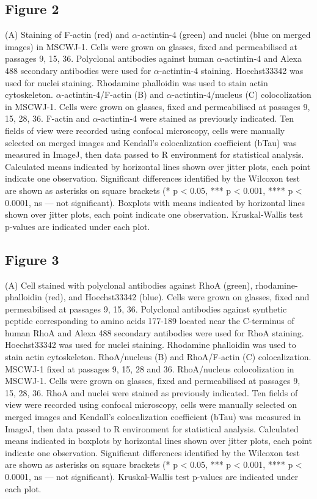 \documentclass[alpha-refs]{wiley-article}
\begin{document}
\subsection*{Figure 2}
(A) Staining of F-actin (red) and $\alpha$-actintin-4 (green) and nuclei (blue on merged images) in MSCWJ-1.
Cells were grown on glasses, fixed and permeabilised at passages 9, 15, 36.
Polyclonal antibodies against human $\alpha$-actintin-4 and Alexa 488 secondary antibodies were used for $\alpha$-actintin-4 staining.
Hoechst33342 was used for nuclei staining.
Rhodamine phalloidin was used to stain actin cytoskeleton.
$\alpha$-actintin-4/F-actin (B) and $\alpha$-actintin-4/nucleus (C) colocolization in MSCWJ-1.
Cells were grown on glasses, fixed and permeabilised at passages 9, 15, 28, 36.
F-actin and $\alpha$-actintin-4 were stained as previously indicated.
Ten fields of view were recorded using confocal microscopy, cells were manually selected on merged images and Kendall's colocalization coefficient (bTau) was measured in ImageJ, then data passed to R environment for statistical analysis.
Calculated means indicated by horizontal lines shown over jitter plots, each point indicate one observation.
Significant differences identified by the Wilcoxon test are shown as asterisks on square brackets (* p < 0.05, *** p < 0.001, **** p < 0.0001, ns --- not significant).
Boxplots with means indicated by horizontal lines shown over jitter plots, each point indicate one observation.
Kruskal-Wallis test p-values are indicated under each plot.

\subsection*{Figure 3}
(A) Cell stained with polyclonal antibodies against RhoA (green), rhodamine-phalloidin (red), and Hoechst33342 (blue).
Cells were grown on glasses, fixed and permeabilised at passages 9, 15, 36.
Polyclonal antibodies against synthetic peptide corresponding to amino acids 177-189 located near the C-terminus of human RhoA and Alexa 488 secondary antibodies were used for RhoA staining.
Hoechst33342 was used for nuclei staining.
Rhodamine phalloidin was used to stain actin cytoskeleton.
RhoA/nucleus (B) and RhoA/F-actin  (C) colocalization.
MSCWJ-1 fixed at passages 9, 15, 28 and 36.
RhoA/nucleus colocolization in MSCWJ-1.
Cells were grown on glasses, fixed and permeabilised at passages 9, 15, 28, 36.
RhoA and nuclei were stained as previously indicated.
Ten fields of view were recorded using confocal microscopy, cells were manually selected on merged images and Kendall's colocalization coefficient (bTau) was measured in ImageJ, then data passed to R environment for statistical analysis.
Calculated means indicated in boxplots by horizontal lines shown over jitter plots, each point indicate one observation.
Significant differences identified by the Wilcoxon test are shown as asterisks on square brackets (* p < 0.05, *** p < 0.001, **** p < 0.0001, ns --- not significant).
Kruskal-Wallis test p-values are indicated under each plot.
\end{document}
